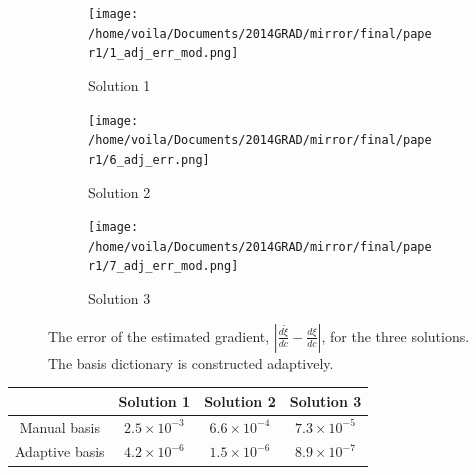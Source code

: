 \begin{figure}[htbp]\begin{center}
    \begin{subfigure}[t]{.32\textwidth}
        \centering
        \texttt{[image: /home/voila/Documents/2014GRAD/mirror/final/paper1/1\_adj\_err\_mod.png]}
        \caption{Solution 1}
        \label{fig: grad BL 1}
    \end{subfigure}
    \begin{subfigure}[t]{.32\textwidth}     
        \centering
        \texttt{[image: /home/voila/Documents/2014GRAD/mirror/final/paper1/6\_adj\_err.png]}
        \caption{Solution 2}
        \label{fig: grad BL 2}
    \end{subfigure}
    \begin{subfigure}[t]{.32\textwidth}
        \centering
        \texttt{[image: /home/voila/Documents/2014GRAD/mirror/final/paper1/7\_adj\_err\_mod.png]}
        \caption{Solution 3}
        \label{fig: grad BL 3}
    \end{subfigure}
    \caption{The error of the estimated gradient, $\left|\frac{d\tilde{\xi}}{dc} - \frac{d\xi}{dc}
             \right|$, for the three solutions. The basis dictionary is constructed adaptively.}
    \label{fig: adap basis grad err BL}
\end{center}\end{figure}


\begin{center}
    \begin{tabular}{|c|c|c|c|}
       \hline\hline
         & Solution 1 & Solution 2 & Solution 3\\
       \hline
       Manual basis & $2.5\times 10^{-3}$& $6.6\times 10^{-4}$ & $7.3\times 10^{-5}$ \\
       \hline
       Adaptive basis & $4.2\times 10^{-6}$& $1.5\times 10^{-6}$ & $8.9\times 10^{-7}$ \\
       \hline\hline
    \end{tabular}
    \label{table: BL grad error}
\end{center}


